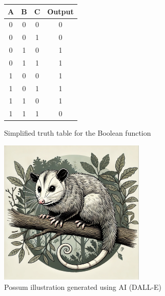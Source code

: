 \begin{figure}[H]
    \centering
    \begin{minipage}{0.45\textwidth}
        \centering
        \begin{tabular}{|c|c|c|c|}
            \hline
            A & B & C & Output \\
            \hline
            0 & 0 & 0 & 0 \\
            0 & 0 & 1 & 0 \\
            0 & 1 & 0 & 1 \\
            0 & 1 & 1 & 1 \\
            1 & 0 & 0 & 1 \\
            1 & 0 & 1 & 1 \\
            1 & 1 & 0 & 1 \\
            1 & 1 & 1 & 0 \\
            \hline
        \end{tabular}
        \caption{Simplified truth table for the Boolean function}
        \label{tab:simplified_truth_table}
    \end{minipage}
    \hfill
    \begin{minipage}{0.45\textwidth}
        \centering
        \includegraphics[width=0.62\textwidth]{figures/possum.png}
        \caption{Possum illustration generated using AI (DALL-E)\cite{openai2024possum}}
        \label{fig:possum}
    \end{minipage}
\end{figure}

